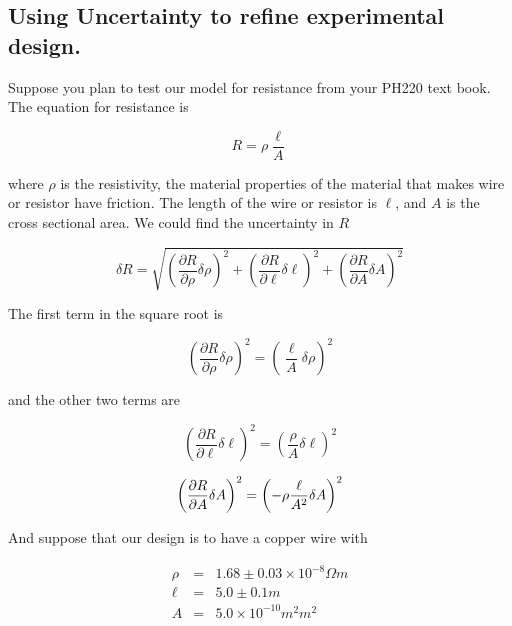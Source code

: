 \subsection{Using Uncertainty to refine experimental design.}

Suppose you plan to test our model for resistance from your PH220 text book.
The equation for resistance is 

\begin{equation*}
	R=\rho \frac{\ell }{A}
\end{equation*}

where $\rho $ is the resistivity, the material properties of the material that makes wire or resistor have friction. The length of the wire or resistor is $\ell $, and $A$ is the cross sectional area. We could find the uncertainty in $R$

\begin{equation*}
	\delta R=\sqrt{\left( \frac{\partial R}{\partial \rho }\delta \rho \right)
		^{2}+\left( \frac{\partial R}{\partial \ell }\delta \ell \right) ^{2}+\left( 
		\frac{\partial R}{\partial A}\delta A\right) ^{2}}
\end{equation*}

The first term in the square root is 

\begin{equation*}
	\left( \frac{\partial R}{\partial \rho }\delta \rho \right) ^{2}=\left( 
	\frac{\ell }{A}\delta \rho \right) ^{2}
\end{equation*}

and the other two terms are 

\begin{equation*}
	\left( \frac{\partial R}{\partial \ell }\delta \ell \right) ^{2}=\left( 
	\frac{\rho }{A}\delta \ell \right) ^{2}
\end{equation*}

\begin{equation*}
	\left( \frac{\partial R}{\partial A}\delta A\right) ^{2}=\left( -\rho \frac{%
		\ell }{A^{2}}\delta A\right) ^{2}
\end{equation*}

And suppose that our design is to have a copper wire with 

\begin{eqnarray*}
	\rho &=&1.68\pm 0.03\times 10^{-8}\unit{\Omega}\unit{m} \\
	\ell &=&5.0\pm 0.1\unit{m} \\
	A &=&5.0\times 10^{-10}\unit{m}^{2}\unit{m}^{2}
\end{eqnarray*}

